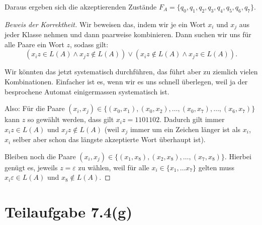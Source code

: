 \documentclass[11pt]{article} %
\theoremstyle{definition}
\begin{document}
Daraus ergeben sich die akzeptierenden Zustände $F_A = \{q_0, q_1, q_2, q_3, q_4, q_5, q_6, q_7 \}$.

\begin{proof}[Beweis der Korrektheit]
Wir beweisen das, indem wir je ein Wort $x_i$ und $x_j$ aus jeder Klasse nehmen und dann paarweise kombinieren. Dann suchen wir uns für alle Paare ein Wort $z$, sodass gilt:
\[
(x_iz \in L(A) \land x_jz \notin L(A)) \lor (x_iz \notin L(A) \land x_jz \in L(A)).
\]

Wir könnten das jetzt systematisch durchführen, das führt aber zu ziemlich vielen Kombinationen. Einfacher ist es, wenn wir es uns schnell überlegen, weil ja der besprochene Automat einigermassen systematisch ist.

Also: Für die Paare $(x_i, x_j) \in \{ (x_0, x_1), (x_0, x_2), \dots, (x_0, x_7), \dots, (x_6, x_7) \}$ kann $z$ so gewählt werden, dass gilt $x_iz = 1101102$. Dadurch gilt immer $x_iz \in L(A)$ und $x_jz \notin L(A)$ (weil $x_j$ immer um ein Zeichen länger ist als $x_i$, $x_i$ selber aber schon das längste akzeptierte Wort überhaupt ist).

Bleiben noch die Paare $(x_i, x_j) \in \{ (x_1, x_8), (x_2, x_8), \dots, (x_7, x_8) \}$. Hierbei genügt es, jeweils $z = \varepsilon$ zu wählen, weil für alle $x_i \in \{ x_1, \dots x_7 \}$ gelten muss $x_i\varepsilon \in L(A)$ und $x_8 \notin L(A)$.
\end{proof}

\section*{Teilaufgabe 7.4(g)}
\end{document}
